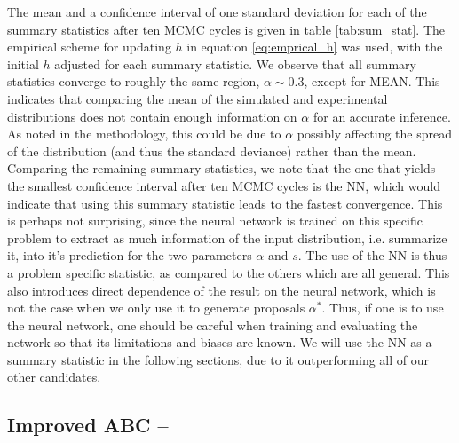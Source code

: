 \documentclass[11pt,a4paper]{article}
\begin{document}
The mean and a confidence interval of one standard deviation for each of the summary statistics after ten MCMC cycles is given in table \ref{tab:sum_stat}. The empirical scheme for updating $h$ in equation \eqref{eq:emprical_h} was used, with the initial $h$ adjusted for each summary statistic. We observe that all summary statistics converge to roughly the same region, $\alpha \sim 0.3$, except for MEAN. This indicates that comparing the mean of the simulated and experimental distributions does not contain enough information on $\alpha$ for an accurate inference. As noted in the methodology, this could be due to $\alpha$ possibly affecting the spread of the distribution (and thus the standard deviance) rather than the mean. Comparing the remaining summary statistics, we note  that the one that yields the smallest confidence interval after ten MCMC cycles is the NN, which would indicate that using this summary statistic leads to the fastest convergence. This is perhaps not surprising, since the neural network is trained on this specific problem to extract as much information of the input distribution, i.e. summarize it, into it's prediction for the two parameters $\alpha$ and $s$. The use of the NN is thus a problem specific statistic, as compared to the others which are all general. This also introduces direct dependence of the result on the neural network, which is not the case when we only use it to generate proposals $\alpha^*$. Thus, if one is to use the neural network, one should be careful when training and evaluating the network so that its limitations and biases are known. We will use the NN as a summary statistic in the following sections, due to it outperforming all of our other candidates.


\subsection[Task 4]{Improved ABC -- }
\label{sec:result_ABC}


\printbibliography
\end{document}
